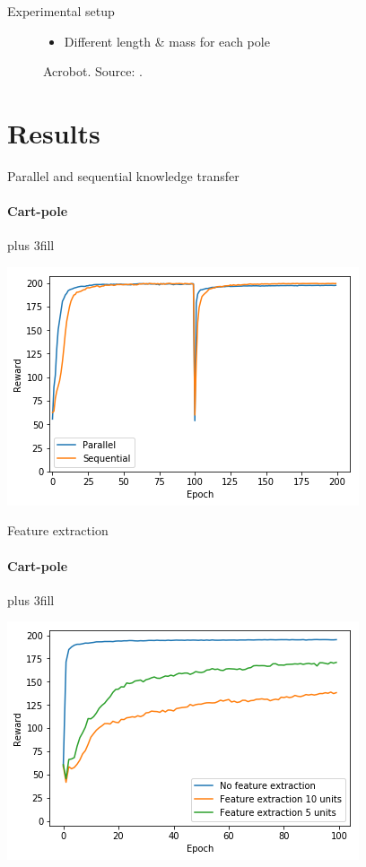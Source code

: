 \documentclass{beamer}
\begin{document}
\begin{frame}[fragile]{Experimental setup}
\begin{figure}[htb]
\begin{minipage}{0.45\textwidth}
            \caption{Acrobot. Source: \cite{fremaux2013reinforcement}.}
            \begin{itemize}
                \item Different length \& mass for each pole
            \end{itemize}
    \end{minipage}
\end{figure}

\end{frame}

\section{Results}
\frame{\sectionpage}
\begin{frame}[fragile]{Parallel and sequential knowledge transfer}
\framesubtitle{Cart-pole}
\vskip0pt plus 3fill
\begin{center}
    \includegraphics[width=.8\linewidth]{results/CartPole/kt_akt/reward_source-target_5tasks.png}
\end{center}
\end{frame}

\begin{frame}[fragile]{Feature extraction}
\framesubtitle{Cart-pole}
\vskip0pt plus 3fill
\begin{center}
    \includegraphics[width=.8\linewidth]{results/CartPole/feature_extraction.png}
\end{center}
\end{frame}
\end{document}
